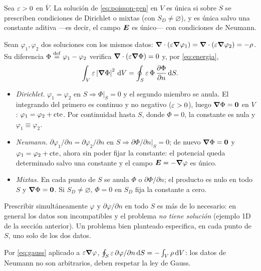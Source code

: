 \documentclass[11pt,a4paper,twoside]{article}
\begin{document}
\begin{teorema}[Unicidad]\label{teo:unicidad}
Sea $\varepsilon>0$ en $\overline V$. La solución de \eqref{eq:poisson-gen} en $V$ es única si sobre
$S$ se prescriben condiciones de Dirichlet o mixtas (con $S_D\neq\varnothing$), y es única
salvo una constante aditiva ---es decir, el campo $\bm{E}$ es único--- con condiciones de
Neumann.
\end{teorema}

\begin{demostracion}
Sean $\varphi_1,\varphi_2$ dos soluciones con los mismos datos:
$\bm{\nabla}\cdot(\varepsilon\bm{\nabla}\varphi_1)=\bm{\nabla}\cdot(\varepsilon\bm{\nabla}\varphi_2)=-\rho$. Su diferencia
$\Phi\mathrel{\overset{\mathrm{def}}{=}}\varphi_1-\varphi_2$ verifica $\bm{\nabla}\cdot(\varepsilon\bm{\nabla}\Phi)=0$ y, por
\eqref{eq:energia},
\[
  \int_V\varepsilon\left\lvert \bm{\nabla}\Phi\right\rvert^{2}\,\mathrm{d} V=\oint_S\varepsilon\,\Phi\,\frac{\partial \Phi}{\partial n}\,\mathrm{d} S .
\]
\begin{itemize}
  \item \emph{Dirichlet.} $\varphi_1=\varphi_2$ en $S\Rightarrow\Phi|_S=0$ y el segundo miembro
  se anula. El integrando del primero es continuo y no negativo ($\varepsilon>0$), luego
  $\bm{\nabla}\Phi=\bm0$ en $V$: $\varphi_1=\varphi_2+\mathrm{cte}$. Por continuidad hasta $S$, donde
  $\Phi=0$, la constante es nula y $\varphi_1\equiv\varphi_2$.
  \item \emph{Neumann.} $\partial\varphi_1/\partial n=\partial\varphi_2/\partial n$ en
  $S\Rightarrow\partial\Phi/\partial n|_S=0$; de nuevo $\bm{\nabla}\Phi=\bm0$ y
  $\varphi_1=\varphi_2+\mathrm{cte}$, ahora sin poder fijar la constante: el potencial queda
  determinado salvo una constante y el campo $\bm{E}=-\bm{\nabla}\varphi$ es único.
  \item \emph{Mixtas.} En cada punto de $S$ se anula $\Phi$ o $\partial\Phi/\partial n$; el
  producto es nulo en todo $S$ y $\bm{\nabla}\Phi=\bm0$. Si $S_D\neq\varnothing$, $\Phi=0$ en
  $S_D$ fija la constante a cero.
\end{itemize}
\end{demostracion}

\begin{observacion}
Prescribir simultáneamente $\varphi$ y $\partial\varphi/\partial n$ en todo $S$ es más de lo
necesario: en general los datos son incompatibles y el problema \emph{no tiene solución}
(ejemplo 1D de la sección anterior). Un problema bien planteado especifica, en cada punto de
$S$, uno solo de los dos datos.
\end{observacion}

\begin{observacion}
Por \eqref{eq:gauss} aplicado a $\varepsilon\bm{\nabla}\varphi$,
$\oint_S\varepsilon\,\partial\varphi/\partial n\,\mathrm{d} S=-\int_V\rho\,\mathrm{d} V$: los datos de Neumann no son
arbitrarios, deben respetar la ley de Gauss.
\end{observacion}
\end{document}
